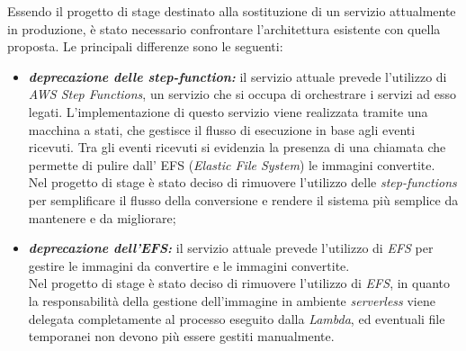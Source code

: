 Essendo il progetto di stage destinato alla sostituzione di un servizio
attualmente in produzione, è stato necessario confrontare l'architettura
esistente con quella proposta. Le principali differenze sono le seguenti:
\begin{itemize}
      \item \textbf{\emph{deprecazione delle step-function:}} il servizio attuale
            prevede l'utilizzo di \emph{AWS Step Functions}, un servizio che si occupa
            di orchestrare i servizi ad esso legati. L'implementazione di questo
            servizio viene realizzata tramite una macchina a stati, che gestisce il
            flusso di esecuzione in base agli eventi ricevuti. Tra gli eventi
            ricevuti si evidenzia la presenza di una chiamata che permette di
            pulire dall' \glsfirstoccur\gls{EFS} (\emph{Elastic File System}) le
            immagini convertite. \\
            Nel progetto di stage è stato deciso di rimuovere l'utilizzo delle
            \emph{step-functions} per semplificare il flusso della conversione e
            rendere il sistema più semplice da mantenere e da migliorare;
      \item \textbf{\emph{deprecazione dell'EFS:}} il servizio attuale prevede
            l'utilizzo di \emph{EFS} per gestire le immagini da convertire e le
            immagini convertite. \\
            Nel progetto di stage è stato deciso di rimuovere l'utilizzo di \emph{EFS}, in
            quanto la responsabilità della gestione dell'immagine in ambiente
            \emph{serverless} viene delegata completamente al processo eseguito
            dalla \emph{Lambda}, ed eventuali file temporanei non devono più
            essere gestiti manualmente.
\end{itemize}

